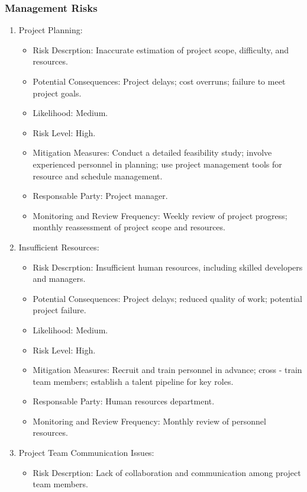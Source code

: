 \documentclass{article}
\begin{document}
\subsubsection{Management Risks}
\begin{enumerate}
    \item Project Planning:
    \begin{itemize}
        \item Risk Descrption: Inaccurate estimation of project scope, difficulty, and resources.
        \item Potential Consequences: Project delays; cost overruns; failure to meet project goals.
        \item Likelihood: Medium.
        \item Risk Level: High.
        \item Mitigation Measures: Conduct a detailed feasibility study; involve experienced personnel in planning; use project management tools for resource and schedule management.
        \item Responsable Party: Project manager.
        \item Monitoring and Review Frequency: Weekly review of project progress; monthly reassessment of project scope and resources.
    \end{itemize}
    \item Insufficient Resources:
    \begin{itemize}
        \item Risk Descrption: Insufficient human resources, including skilled developers and managers.
        \item Potential Consequences: Project delays; reduced quality of work; potential project failure.
        \item Likelihood: Medium.
        \item Risk Level: High. 
        \item Mitigation Measures: Recruit and train personnel in advance; cross - train team members; establish a talent pipeline for key roles.
        \item Responsable Party: Human resources department.
        \item Monitoring and Review Frequency: Monthly review of personnel resources.
    \end{itemize}
    \item Project Team Communication Issues:
    \begin{itemize}
        \item Risk Descrption: Lack of collaboration and communication among project team members.

\end{itemize}
\end{enumerate}
\end{document}
